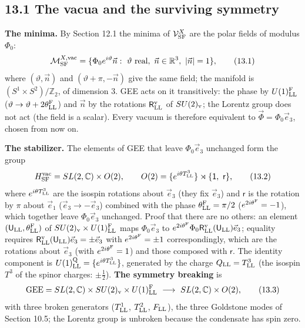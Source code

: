 \documentclass[
  10pt,
]{article}
\begin{document}
\hypertarget{the-vacua-and-the-surviving-symmetry}{%
\subsection{13.1 The vacua and the surviving
symmetry}\label{the-vacua-and-the-surviving-symmetry}}

\textbf{The minima.} By Section 12.1 the minima of
\(\mathcal V^X_{\rm SF}\) are the polar fields of modulus \(\Phi_0\):
\[\mathcal M^{X,{\rm vac}}_{\rm SF}=\{\Phi_0e^{i\vartheta}\vec n:\ \vartheta\ \text{real},\ \vec n\in\mathbb R^3,\ \lvert\vec n\rvert=1\},\tag{13.1}\]
where \((\vartheta,\vec n)\) and \((\vartheta+\pi,-\vec n)\) give the
same field; the manifold is \((S^1\times S^2)/\mathbb Z_2\), of
dimension 3. GEE acts on it transitively: the phase by
\(U(1)^{\rm F}_{\rm LL}\)
(\(\vartheta\to\vartheta+2\theta^{\rm F}_{\rm LL}\)) and \(\vec n\) by
the rotations \(\mathsf R^{\rm v}_{\rm LL}\) of \(SU(2)_{\rm v}\); the
Lorentz group does not act (the field is a scalar). Every vacuum is
therefore equivalent to \(\vec\Phi=\Phi_0\vec e_3\), chosen from now on.

\textbf{The stabilizer.} The elements of GEE that leave
\(\Phi_0\vec e_3\) unchanged form the group
\[H^{\rm vac}_{\rm SF}=SL(2,\mathbb C)\times O(2),\qquad O(2)=\{e^{i\theta T^3_{\rm LL}}\}\rtimes\{\mathsf 1,\ \mathsf r\},\tag{13.2}\]
where \(e^{i\theta T^3_{\rm LL}}\) are the isospin rotations about
\(\vec e_3\) (they fix \(\vec e_3\)) and \(\mathsf r\) is the rotation
by \(\pi\) about \(\vec e_1\) (\(\vec e_3\to-\vec e_3\)) combined with
the phase \(\theta^{\rm F}_{\rm LL}=\pi/2\)
(\(e^{2i\theta^{\rm F}}=-1\)), which together leave \(\Phi_0\vec e_3\)
unchanged. Proof that there are no others: an element
\((\mathsf U_{\rm LL},\theta^{\rm F}_{\rm LL})\) of
\(SU(2)_{\rm v}\times U(1)^{\rm F}_{\rm LL}\) maps \(\Phi_0\vec e_3\) to
\(e^{2i\theta^{\rm F}}\Phi_0\mathsf R^{\rm v}_{\rm LL}(\mathsf U_{\rm LL})\vec e_3\);
equality requires
\(\mathsf R^{\rm v}_{\rm LL}(\mathsf U_{\rm LL})\vec e_3=\pm\vec e_3\)
with \(e^{2i\theta^{\rm F}}=\pm1\) correspondingly, which are the
rotations about \(\vec e_3\) (with \(e^{2i\theta^{\rm F}}=1\)) and those
composed with \(\mathsf r\). The identity component is
\(U(1)^{\rm Q}_{\rm LL}=\{e^{i\theta T^3_{\rm LL}}\}\), generated by the
charge \(Q_{\rm LL}=T^3_{\rm LL}\) (the isospin \(T^3\) of the spinor
charges: \(\pm\tfrac12\)). \textbf{The symmetry breaking} is
\[\mathrm{GEE}=SL(2,\mathbb C)\times SU(2)_{\rm v}\times U(1)^{\rm F}_{\rm LL}\ \longrightarrow\ SL(2,\mathbb C)\times O(2),\tag{13.3}\]
with three broken generators (\(T^1_{\rm LL}\), \(T^2_{\rm LL}\),
\(F_{\rm LL}\)), the three Goldstone modes of Section 10.5; the Lorentz
group is unbroken because the condensate has spin zero.
\end{document}
